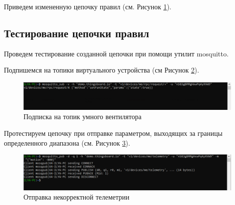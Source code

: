 \documentclass[a4paper,14pt]{extarticle}
\begin{document}



Приведем измененную цепочку правил (см. Рисунок \ref{fig:chain-fan}).
\begin{figure}[h!]
	\begin{minipage}[h!]{\linewidth}
	\end{minipage}

	\begin{minipage}[h!]{\linewidth}
	\end{minipage}
	\label{fig:chain-fan}
\end{figure}
\newpage
\subsection*{Тестирование цепочки правил}
\label{sec:fan-test}
Проведем тестирование созданной цепочки при помощи утилит mosquitto.

Подпишемся на топики виртуального устройства (см Рисунок \ref{fig:t1-sub}).
\begin{figure}[h!]
	\centering
	\includegraphics[width=1\linewidth]{images/t1-sub}
	\caption{Подписка на топик умного вентилятора}
	\label{fig:t1-sub}
\end{figure}

Протестируем цепочку при отправке параметром, выходящих за границы определенного диапазона (см. Рисунок \ref{fig:t1-pub-range}).

\begin{figure}[h!]
	\centering
	\includegraphics[width=1\linewidth]{images/t1-pub-range}
	\caption{Отправка некорректной телеметрии}
	\label{fig:t1-pub-range}
\end{figure}
\end{document}
